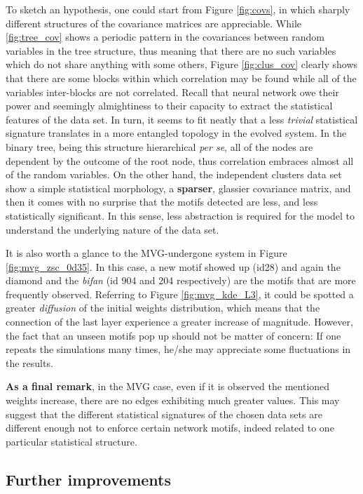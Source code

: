 \documentclass[a4paper,12pt]{article}
\begin{document}
To sketch an hypothesis, one could start from Figure \ref{fig:covs}, in which sharply different structures of the covariance matrices are appreciable. While \ref{fig:tree_cov} shows a periodic pattern in the covariances between random variables in the tree structure, thus meaning that there are no such variables which do not share anything with some others, Figure \ref{fig:clus_cov} clearly shows that there are some blocks within which correlation may be found while all of the variables inter-blocks are not correlated. Recall that neural network owe their power and seemingly almightiness to their capacity to extract the statistical features of the data set. In turn, it seems to fit neatly that a less \textit{trivial} statistical signature translates in a more entangled topology in the evolved system. In the binary tree, being this structure hierarchical \textit{per se}, all of the nodes are dependent by the outcome of the root node, thus correlation embraces almost all of the random variables. On the other hand, the independent clusters data set show a simple statistical morphology, a \textbf{sparser}, glassier covariance matrix, and then it comes with no surprise that the motifs detected are less, and less statistically significant. In this sense, less abstraction is required for the model to understand the underlying nature of the data set.

It is also worth a glance to the MVG-undergone system in Figure \ref{fig:mvg_zsc_0d35}. In this case, a new motif showed up (id28) and again the diamond and the \textit{bifan} (id 904 and 204 respectively) are the motifs that are more frequently observed. Referring to Figure \ref{fig:mvg_kde_L3}, it could be spotted a greater \textit{diffusion} of the initial weights distribution, which means that the connection of the last layer experience a greater increase of magnitude. However, the fact that an unseen motifs pop up should not be matter of concern: If one repeats the simulations many times, he/she may appreciate some fluctuations in the results.

\textbf{As a final remark}, in the MVG case, even if it is observed the mentioned weights increase, there are no edges exhibiting much greater values. This may suggest that the different statistical signatures of the chosen data sets are different enough not to enforce certain network motifs, indeed related to one particular statistical structure.


\subsection{Further improvements}
\end{document}
